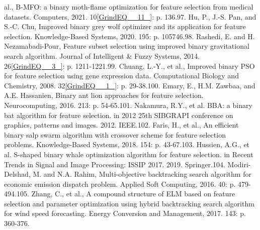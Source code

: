 \documentclass{article} %
\begin{document}
al., B-MFO: a binary moth-flame optimization for feature selection from medical datasets. Computers, 2021. 10\eqref{GrindEQ__11_}: p. 136.97. Hu, P., J.-S. Pan, and S.-C. Chu, Improved binary grey wolf optimizer and its application for feature selection. Knowledge-Based Systems, 2020. 195: p. 105746.98. Rashedi, E. and H. Nezamabadi-Pour, Feature subset selection using improved binary gravitational search algorithm. Journal of Intelligent \& Fuzzy Systems, 2014. 26\eqref{GrindEQ__3_}: p. 1211-1221.99. Chuang, L.-Y., et al., Improved binary PSO for feature selection using gene expression data. Computational Biology and Chemistry, 2008. 32\eqref{GrindEQ__1_}: p. 29-38.100. Emary, E., H.M. Zawbaa, and A.E. Hassanien, Binary ant lion approaches for feature selection. Neurocomputing, 2016. 213: p. 54-65.101. Nakamura, R.Y., et al. BBA: a binary bat algorithm for feature selection. in 2012 25th SIBGRAPI conference on graphics, patterns and images. 2012. IEEE.102. Faris, H., et al., An efficient binary salp swarm algorithm with crossover scheme for feature selection problems. Knowledge-Based Systems, 2018. 154: p. 43-67.103. Hussien, A.G., et al. S-shaped binary whale optimization algorithm for feature selection. in Recent Trends in Signal and Image Processing: ISSIP 2017. 2019. Springer.104. Modiri-Delshad, M. and N.A. Rahim, Multi-objective backtracking search algorithm for economic emission dispatch problem. Applied Soft Computing, 2016. 40: p. 479-494.105. Zhang, C., et al., A compound structure of ELM based on feature selection and parameter optimization using hybrid backtracking search algorithm for wind speed forecasting. Energy Conversion and Management, 2017. 143: p. 360-376.

\noindent 
\end{document}
